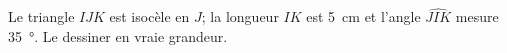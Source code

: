 
\begin{exercice}\label{exosmath-0851}

    Le triangle \( IJK\) est isocèle en \( J\); la longueur \( IK\) est \SI{5}{\centi\meter} et l'angle \( \widehat{JIK}\) mesure \SI{35}{\degree}. Le dessiner en vraie grandeur.

\end{exercice}
